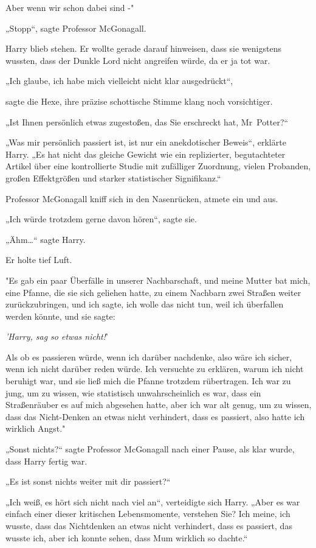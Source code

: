 {Aber wenn wir schon dabei sind -"

„Stopp“, sagte Professor McGonagall.

Harry blieb stehen. Er wollte gerade darauf hinweisen, dass sie wenigstens wussten, dass der Dunkle Lord nicht angreifen würde, da er ja tot war.

„Ich glaube, ich habe mich vielleicht nicht klar ausgedrückt“,

sagte die Hexe, ihre präzise schottische Stimme klang noch vorsichtiger.

„Ist Ihnen persönlich etwas zugestoßen, das Sie erschreckt hat, Mr~Potter?“

„Was mir persönlich passiert ist, ist nur ein anekdotischer Beweis“, erklärte Harry. „Es hat nicht das gleiche Gewicht wie ein replizierter, begutachteter Artikel über eine kontrollierte Studie mit zufälliger Zuordnung, vielen Probanden, großen Effektgrößen und starker statistischer Signifikanz.“

Professor McGonagall kniff sich in den Nasenrücken, atmete ein und aus.

„Ich würde trotzdem gerne davon hören“, sagte sie.

„Ähm…“ sagte Harry.

Er holte tief Luft.

"Es gab ein paar Überfälle in unserer Nachbarschaft, und meine Mutter bat mich, eine Pfanne, die sie sich geliehen hatte, zu einem Nachbarn zwei Straßen weiter zurückzubringen, und ich sagte, ich wolle das nicht tun, weil ich überfallen werden könnte, und sie sagte:

\emph{'Harry, sag so etwas nicht!}'

Als ob es passieren würde, wenn ich darüber nachdenke, also wäre ich sicher, wenn ich nicht darüber reden würde. Ich versuchte zu erklären, warum ich nicht beruhigt war, und sie ließ mich die Pfanne trotzdem rübertragen. Ich war zu jung, um zu wissen, wie statistisch unwahrscheinlich es war, dass ein Straßenräuber es auf mich abgesehen hatte, aber ich war alt genug, um zu wissen, dass das Nicht-Denken an etwas nicht verhindert, dass es passiert, also hatte ich wirklich Angst."

„Sonst nichts?“ sagte Professor McGonagall nach einer Pause, als klar wurde, dass Harry fertig war.

„Es ist sonst nichts weiter mit dir passiert?“

„Ich weiß, es hört sich nicht nach viel an“, verteidigte sich Harry. „Aber es war einfach einer dieser kritischen Lebensmomente, verstehen Sie? Ich meine, ich wusste, dass das Nichtdenken an etwas nicht verhindert, dass es passiert, das wusste ich, aber ich konnte sehen, dass Mum wirklich so dachte.“

}
